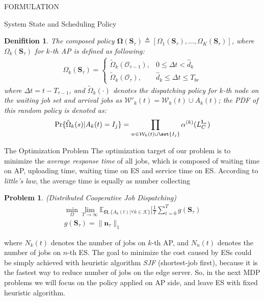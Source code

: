 \documentclass[10pt, conference, letterpaper]{IEEEtran}
\newtheorem{definition}{Denifition}
\newtheorem{problem}{Problem}
\renewcommand{\vec}{\mathbf}
\DeclarePairedDelimiter\set\{\}
\newcommand{\apSet}{\mathcal{K}}
\newcommand{\wSet}{\mathcal{W}}
\newcommand{\Stat}{\mathbf{S}}
\newcommand{\Obsv}{\mathcal{O}}
\begin{document}
\begin{section}{FORMULATION}
\begin{subsection}{System State and Scheduling Policy}
\begin{definition}
                The composed policy $\vec{\Omega}(\Stat_\tau) \triangleq [\Omega_1(\Stat_\tau), \dots, \Omega_K(\Stat_\tau)]$, where $\Omega_k(\Stat_\tau)$ for $k$-th AP is defined as following:
                \begin{align}
                    \Omega_k(\Stat_\tau) = 
                    \begin{cases}
                        \tilde{\Omega}_k(\Obsv_{\tau-1}), & 0 \leq \Delta{t} < \hat{d}_k
                        \\
                        \tilde{\Omega}_k(\Obsv_{\tau}), & \hat{d}_k \leq \Delta{t} \leq T_{br}
                    \end{cases}
                \end{align}
                where $\Delta{t} = t - T_{\tau-1}$, and $\tilde{\Omega}_k(\cdot)$ denotes the dispatching policy for $k$-th node on the waiting job set and arrival jobs as $\wSet'_{k}(t)=\wSet_{k}(t) \cup A_k(t)$; the PDF of this random policy is denoted as:
                \begin{align}
                    \Pr\{\tilde{\Omega}_k(s)|A_k(t)=I_j\} = \prod_{w\in\wSet_{k}(t)\cup\set{I_j}} \alpha^{(k)}(L_C^{\vec{l}_w})
                \end{align}
            \end{definition}
        \end{subsection}

        \begin{subsection}{The Optimization Problem}
            The optimization target of our problem is to minimize the \emph{average response time} of all jobs, which is composed of waiting time on AP, uploading time, waiting time on ES and service time on ES. According to \emph{little's law}, the average time is equally as number collecting 
            
            \begin{problem}
                (Distributed Cooperative Job Dispatching)
                \begin{gather}
                    \min_{\Omega} \lim_{T \to \infty}
                        \mathbb{E}_{\mathbf{\Omega}, \{A_k(t)|\forall k\in\apSet\}}
                            [\frac{1}{T} \sum_{t=0}^{T} g(\Stat_\tau)
                    \nonumber\\
                    g(\Stat_\tau) = \|\vec{n}_\tau\|_{1}
                \end{gather}
            \end{problem}
            where $N_k(t)$ denotes the number of jobs on $k$-th AP, and $N_n(t)$ denotes the number of jobs on $n$-th ES.
            The goal to minimize the cost caused by ESs could be simply achieved with heuristic algorithm \emph{SJF} (shortest-job first), because it is the fastest way to reduce number of jobs on the edge server. So, in the next MDP problems we will focus on the policy applied on AP side, and leave ES with fixed heuristic algorithm.


\end{subsection}
\end{section}
\end{document}
